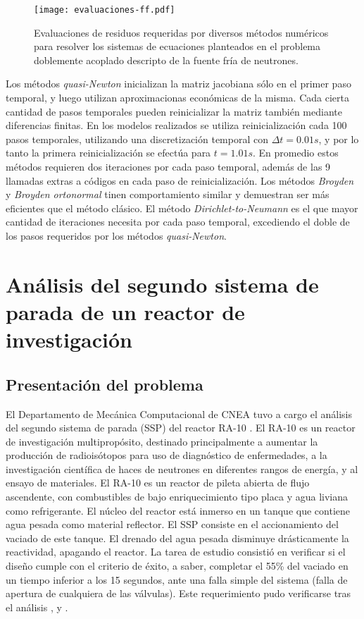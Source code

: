 \begin{figure}[ht]
\centering{}\texttt{[image: evaluaciones-ff.pdf]}
\caption
{Evaluaciones de residuos requeridas por diversos métodos numéricos para resolver los sistemas de ecuaciones planteados
 en el problema doblemente acoplado descripto de la fuente fría de neutrones.} \label{iteraciones_ri} 
\end{figure}

Los métodos \textit{quasi-Newton} inicializan la matriz jacobiana sólo en el primer paso temporal,
y luego utilizan aproximacionas económicas de la misma. 
Cada cierta cantidad de pasos temporales pueden reinicializar la matriz también mediante diferencias finitas. 
En los modelos realizados se utiliza reinicialización cada 100 pasos temporales,
utilizando una discretización temporal con $\Delta t=0.01s$, 
y por lo tanto la primera reinicialización se efectúa para $t=1.01s$.
En promedio estos métodos requieren dos iteraciones por cada paso temporal, 
además de las 9 llamadas extras a códigos en cada paso de reinicialización.
Los métodos \textit{Broyden} y \textit{Broyden ortonormal} tinen comportamiento similar y demuestran ser más eficientes que el método clásico.
El método \textit{Dirichlet-to-Neumann} es el que mayor cantidad de iteraciones necesita por cada paso temporal, 
excediendo el doble de los pasos requeridos por los métodos \textit{quasi-Newton}.

\section{Análisis del segundo sistema de parada de un reactor de investigación}
\label{3:mockup}

\subsection*{Presentación del problema}
El Departamento de Mecánica Computacional de CNEA tuvo a cargo el análisis del segundo sistema de parada (SSP) del reactor RA-10 \cite{ra10}.
El RA-10 es un reactor de investigación multipropósito, destinado principalmente a aumentar la producción de radioisótopos para uso de diagnóstico de enfermedades,
a la investigación científica de haces de neutrones en diferentes rangos de energía,
y al ensayo de materiales.
El RA-10 es un reactor de pileta abierta de flujo ascendente, con combustibles de bajo enriquecimiento tipo placa y agua liviana como refrigerante.
El núcleo del reactor está inmerso en un tanque que contiene agua pesada como material reflector.
El SSP consiste en el accionamiento del vaciado de este tanque.
El drenado del agua pesada disminuye drásticamente la reactividad, apagando el reactor.
La tarea de estudio consistió en verificar si el diseño cumple con el criterio de éxito,
a saber, completar el 55\% del vaciado en un tiempo inferior a los 15 segundos,
ante una falla simple del sistema (falla de apertura de cualquiera de las válvulas).
Este requerimiento pudo verificarse tras el análisis \cite{cnea-informe-primero}, \cite{cnea-informe-mockup} y \cite{cnea-informe-ra10}.

